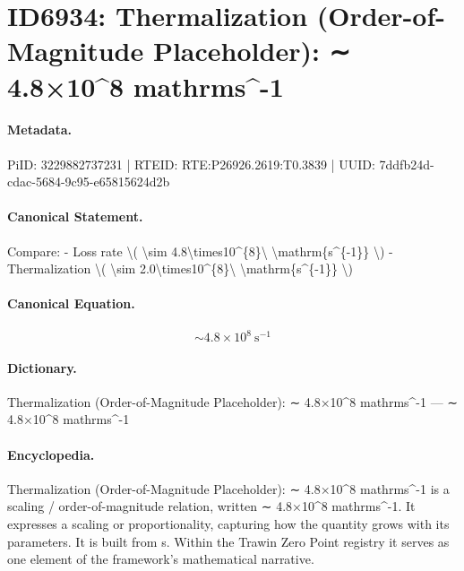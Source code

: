 \section*{ID6934: Thermalization (Order-of-Magnitude Placeholder): ∼ 4.8×10\textasciicircum{}8 mathrms\textasciicircum{}-1}
\paragraph{Metadata.}
PiID: 3229882737231 | RTEID: RTE:P26926.2619:T0.3839 | UUID: 7ddfb24d-cdac-5684-9c95-e65815624d2b

\paragraph{Canonical Statement.}
Compare: - Loss rate \textbackslash{}( \textbackslash{}sim 4.8\textbackslash{}times10\textasciicircum{}\{8\}\textbackslash{} \textbackslash{}mathrm\{s\textasciicircum{}\{-1\}\} \textbackslash{}) - Thermalization \textbackslash{}( \textbackslash{}sim 2.0\textbackslash{}times10\textasciicircum{}\{8\}\textbackslash{} \textbackslash{}mathrm\{s\textasciicircum{}\{-1\}\} \textbackslash{})

\paragraph{Canonical Equation.}
\[
\sim 4.8\times10^{8}\ \mathrm{s^{-1}}
\]

\paragraph{Dictionary.}
Thermalization (Order-of-Magnitude Placeholder): ∼ 4.8×10\textasciicircum{}8 mathrms\textasciicircum{}-1 — ∼ 4.8×10\textasciicircum{}8 mathrms\textasciicircum{}-1

\paragraph{Encyclopedia.}
Thermalization (Order-of-Magnitude Placeholder): ∼ 4.8×10\textasciicircum{}8 mathrms\textasciicircum{}-1 is a scaling / order-of-magnitude relation, written ∼ 4.8×10\textasciicircum{}8 mathrms\textasciicircum{}-1. It expresses a scaling or proportionality, capturing how the quantity grows with its parameters. It is built from s. Within the Trawin Zero Point registry it serves as one element of the framework's mathematical narrative.
